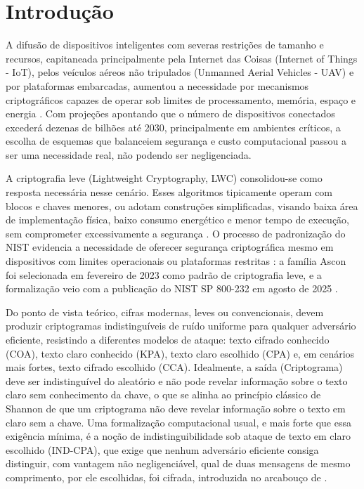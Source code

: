 \chapter{Introdução}

A difusão de dispositivos inteligentes com severas restrições de tamanho e recursos, capitaneada principalmente pela Internet das Coisas (Internet of Things - IoT), pelos veículos aéreos não tripulados (Unmanned Aerial Vehicles - UAV) e por plataformas embarcadas, aumentou a necessidade por mecanismos criptográficos capazes de operar sob limites de processamento, memória, espaço e energia \cite{Gusita2021LightweightMCDM}. Com projeções apontando que o número de dispositivos conectados excederá dezenas de bilhões até 2030, principalmente em ambientes críticos, a escolha de esquemas que balanceiem segurança e custo computacional passou a ser uma necessidade real, não podendo ser negligenciada.

A criptografia leve (Lightweight Cryptography, LWC) consolidou-se como resposta necessária nesse cenário. Esses algoritmos tipicamente operam com blocos e chaves menores, ou adotam construções simplificadas, visando baixa área de implementação física, baixo consumo energético e menor tempo de execução, sem comprometer excessivamente a segurança \cite{Radhakrishnan2024LWC_MCDM}. O processo de padronização do NIST evidencia a necessidade de oferecer segurança criptográfica mesmo em dispositivos com limites operacionais ou plataformas restritas \cite{Turan2023NISTLWCFinal}: a família Ascon foi selecionada em fevereiro de 2023 como padrão de criptografia leve, e a formalização veio com a publicação do NIST SP 800-232 em agosto de 2025 \cite{nist_sp800232_2025}.

Do ponto de vista teórico, cifras modernas, leves ou convencionais, devem produzir criptogramas indistinguíveis de ruído uniforme para qualquer adversário eficiente, resistindo a diferentes modelos de ataque: texto cifrado conhecido (COA), texto claro conhecido (KPA), texto claro escolhido (CPA) e, em cenários mais fortes, texto cifrado escolhido (CCA). Idealmente, a saída (Criptograma) deve ser indistinguível do aleatório e não pode revelar informação sobre o texto claro sem conhecimento da chave, o que se alinha ao princípio clássico de Shannon de que um criptograma não deve revelar informação sobre o texto em claro sem a chave. Uma formalização computacional usual, e mais forte que essa exigência mínima, é a noção de indistinguibilidade sob ataque de texto em claro escolhido (IND-CPA), que exige que nenhum adversário eficiente consiga distinguir, com vantagem não negligenciável, qual de duas mensagens de mesmo comprimento, por ele escolhidas, foi cifrada, introduzida no arcabouço de .


